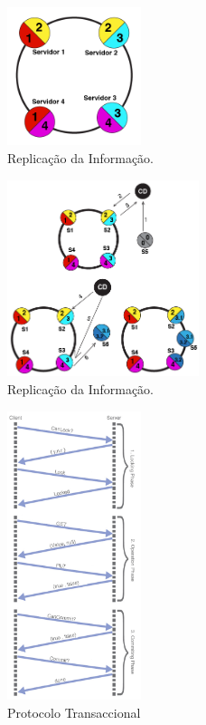 \documentclass[times, 10pt,twocolumn]{article}
\begin{document}
	\begin{figure}[h]
		\centering
			 \includegraphics[width=0.35\textwidth]{replication}
   		\caption{Replicação da Informação.}
	\end{figure}
	\begin{figure}[h]
		\centering
	 	\includegraphics[width=0.5\textwidth]{replicationAlgorithm}
   		\caption{Replicação da Informação.}
	\end{figure}
	\begin{figure}[h]
		\centering
			 \includegraphics[width=0.35\textwidth]{TransactionDiagram}
  		 \caption{Protocolo Transaccional}
	\end{figure}
\end{document}
